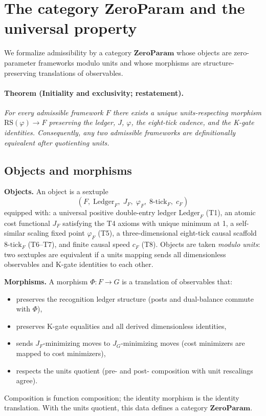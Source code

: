 \documentclass[11pt]{article}
\begin{document}
\section{The category ZeroParam and the universal property}
We formalize admissibility by a category \(\mathbf{ZeroParam}\) whose objects are zero\mbox{-}parameter frameworks modulo units and whose morphisms are structure\mbox{-}preserving translations of observables.

\paragraph{Theorem (Initiality and exclusivity; restatement).} \emph{For every admissible framework \(F\) there exists a unique units\mbox{-}respecting morphism \(\mathrm{RS}(\varphi)\to F\) preserving the ledger, \(J\), \(\varphi\), the eight\mbox{-}tick cadence, and the K\mbox{-}gate identities. Consequently, any two admissible frameworks are definitionally equivalent after quotienting units.}

\subsection{Objects and morphisms}
\textbf{Objects.} An object is a sextuple
\[
  (F,\; \mathrm{Ledger}_F,\; J_F,\; \varphi_F,\; 8\mbox{-}\mathrm{tick}_F,\; c_F)
\]
equipped with: a universal positive double\mbox{-}entry ledger \(\mathrm{Ledger}_F\) (T1), an atomic cost functional \(J_F\) satisfying the T4 axioms with unique minimum at 1, a self\mbox{-}similar scaling fixed point \(\varphi_F\) (T5), a three\mbox{-}dimensional eight\mbox{-}tick causal scaffold \(8\mbox{-}\mathrm{tick}_F\) (T6--T7), and finite causal speed \(c_F\) (T8). Objects are taken \emph{modulo units}: two sextuples are equivalent if a units mapping sends all dimensionless observables and K\mbox{-}gate identities to each other.

\textbf{Morphisms.} A morphism \(\Phi\colon F\to G\) is a translation of observables that:
\begin{itemize}
  \item preserves the recognition ledger structure (posts and dual\mbox{-}balance commute with \(\Phi\)),
  \item preserves K\mbox{-}gate equalities and all derived dimensionless identities,
  \item sends \(J_F\)\mbox{-}minimizing moves to \(J_G\)\mbox{-}minimizing moves (cost minimizers are mapped to cost minimizers),
  \item respects the units quotient (pre\mbox{-} and post\mbox{-} composition with unit rescalings agree).
\end{itemize}
Composition is function composition; the identity morphism is the identity translation. With the units quotient, this data defines a category \(\mathbf{ZeroParam}\).
\end{document}
